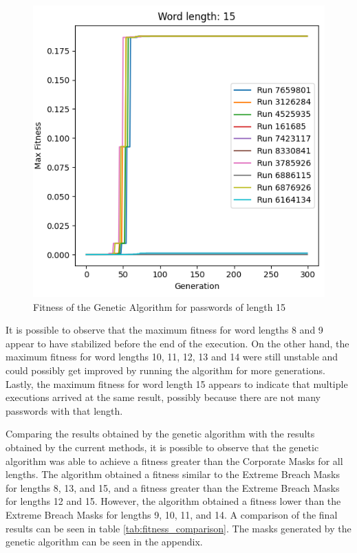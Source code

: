 \documentclass[sigconf,authordraft]{acmart}
\begin{document}
\begin{figure}
  \includegraphics[width=\columnwidth]{genetic_results_15.png}
  \caption{Fitness of the Genetic Algorithm for passwords of length 15}
  \label{fig:fitness_genetic_15}
\end{figure}

It is possible to observe that the maximum fitness for word lengths 8 and 9 appear to have stabilized before the end of the execution.
On the other hand, the maximum fitness for word lengths 10, 11, 12, 13 and 14 were still unstable and could possibly get improved by running the algorithm for more generations.
Lastly, the maximum fitness for word length 15 appears to indicate that multiple executions arrived at the same result, possibly because there are not many passwords with that length.

Comparing the results obtained by the genetic algorithm with the results obtained by the current methods, it is possible to observe that the genetic algorithm was able to achieve a fitness greater than the Corporate Masks for all lengths.
The algorithm obtained a fitness similar to the Extreme Breach Masks for lengths 8, 13, and 15, and a fitness greater than the Extreme Breach Masks for lengths 12 and 15.
However, the algorithm obtained a fitness lower than the Extreme Breach Masks for lengths 9, 10, 11, and 14.
A comparison of the final results can be seen in table \ref{tab:fitness_comparison}.
The masks generated by the genetic algorithm can be seen in the appendix.
\end{document}
